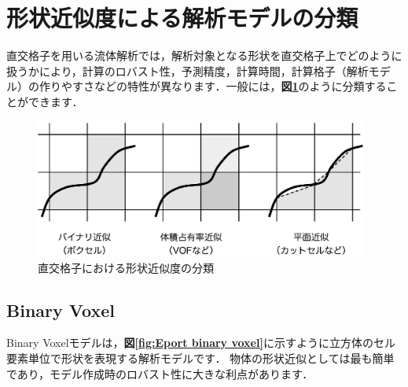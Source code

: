 
\graphicspath{{./fig_Model/}}

%
\section{形状近似度による解析モデルの分類}
\label{sec:classification of model}
直交格子を用いる流体解析では，解析対象となる形状を直交格子上でどのように扱うかにより，計算のロバスト性，予測精度，計算時間，計算格子（解析モデル）の作りやすさなどの特性が異なります．一般には，\textbf{図\ref{fig:class model}}のように分類することができます\cite{CFDハンドブック:03}．

\begin{figure}[htdp]
\begin{center}
\includegraphics[width=11cm,clip]{classification.eps}
\caption{直交格子における形状近似度の分類}
\label{fig:class model}
\end{center}
\end{figure}

%
\subsection{Binary Voxel}
\label{sec:binary voxel}
Binary Voxelモデルは，\textbf{図\ref{fig:Eport binary voxel}}に示すように立方体のセル要素単位で形状を表現する解析モデルです．
物体の形状近似としては最も簡単であり，モデル作成時のロバスト性に大きな利点があります．


